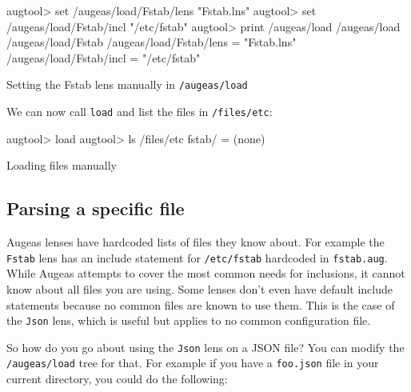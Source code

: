  

\begin{listing}
  \begin{augtoolsh}[]
augtool> set /augeas/load/Fstab/lens "Fstab.lns"
augtool> set /augeas/load/Fstab/incl "/etc/fstab"
augtool> print /augeas/load
/augeas/load
/augeas/load/Fstab
/augeas/load/Fstab/lens = "Fstab.lns"
/augeas/load/Fstab/incl = "/etc/fstab"
  \end{augtoolsh}
  \caption{Setting the Fstab lens manually in \nolinkurl{/augeas/load}}
  \label{lst:metadata_setting_lens_manually}
\end{listing}

We can now call \verb!load! and list the files in \nolinkurl{/files/etc}:

 

\begin{listing}
  \begin{augtoolsh}[]
augtool> load
augtool> ls /files/etc
fstab/ = (none)
  \end{augtoolsh}
  \caption{Loading files manually}
  \label{lst:metadata_call_load}
\end{listing}

\begin{quote}

\end{quote}
\subsection{Parsing a specific file}

Augeas lenses have hardcoded lists of files they know about. For example the \verb!Fstab! lens has an include statement for \nolinkurl{/etc/fstab} hardcoded in \verb!fstab.aug!. While Augeas attempts to cover the most common needs for inclusions, it cannot know about all files you are using. Some lenses don't even have default include statements because no common files are known to use them. This is the case of the \verb!Json! lens, which is useful but applies to no common configuration file.

So how do you go about using the \verb!Json! lens on a JSON file? You can modify the \nolinkurl{/augeas/load} tree for that. For example if you have a \verb!foo.json! file in your current directory, you could do the following:

